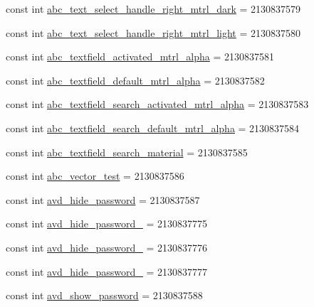 \begin{CompactItemize}
\item 
const int \hyperlink{class__2doo_1_1_droid_1_1_resource_1_1_drawable_b493dcae73aaf7e4c89437e3545d5949}{abc\_\-text\_\-select\_\-handle\_\-right\_\-mtrl\_\-dark} = 2130837579
\item 
const int \hyperlink{class__2doo_1_1_droid_1_1_resource_1_1_drawable_d6b009e7162618d0fa7aae57336c2132}{abc\_\-text\_\-select\_\-handle\_\-right\_\-mtrl\_\-light} = 2130837580
\item 
const int \hyperlink{class__2doo_1_1_droid_1_1_resource_1_1_drawable_371e1bfb6329eb5909397a2a130db9ff}{abc\_\-textfield\_\-activated\_\-mtrl\_\-alpha} = 2130837581
\item 
const int \hyperlink{class__2doo_1_1_droid_1_1_resource_1_1_drawable_1fad5e7a5ec9f1fb1ae57c6f5320470a}{abc\_\-textfield\_\-default\_\-mtrl\_\-alpha} = 2130837582
\item 
const int \hyperlink{class__2doo_1_1_droid_1_1_resource_1_1_drawable_a281d879b754d29b9b6ca7fceb7f0979}{abc\_\-textfield\_\-search\_\-activated\_\-mtrl\_\-alpha} = 2130837583
\item 
const int \hyperlink{class__2doo_1_1_droid_1_1_resource_1_1_drawable_1f5e823056060bb3d931c51f134c9c10}{abc\_\-textfield\_\-search\_\-default\_\-mtrl\_\-alpha} = 2130837584
\item 
const int \hyperlink{class__2doo_1_1_droid_1_1_resource_1_1_drawable_ebb86aea0f176242d9cd68f13e00af09}{abc\_\-textfield\_\-search\_\-material} = 2130837585
\item 
const int \hyperlink{class__2doo_1_1_droid_1_1_resource_1_1_drawable_156d35e219dca7561ebce1e1ae7ad0d3}{abc\_\-vector\_\-test} = 2130837586
\item 
const int \hyperlink{class__2doo_1_1_droid_1_1_resource_1_1_drawable_d0f035fb740990f376e12b9e49027484}{avd\_\-hide\_\-password} = 2130837587
\item 
const int \hyperlink{class__2doo_1_1_droid_1_1_resource_1_1_drawable_625b55db53a37ffc9c6cd281b742dbbd}{avd\_\-hide\_\-password\_} = 2130837775
\item 
const int \hyperlink{class__2doo_1_1_droid_1_1_resource_1_1_drawable_b41fd6d19f1c8656ec629e70ef8c813f}{avd\_\-hide\_\-password\_} = 2130837776
\item 
const int \hyperlink{class__2doo_1_1_droid_1_1_resource_1_1_drawable_9504a51ec6003e581bf64de3fc0618a6}{avd\_\-hide\_\-password\_} = 2130837777
\item 
const int \hyperlink{class__2doo_1_1_droid_1_1_resource_1_1_drawable_86e27fae92fdff2227c45e2bb72f8dbe}{avd\_\-show\_\-password} = 2130837588

\end{CompactItemize}
